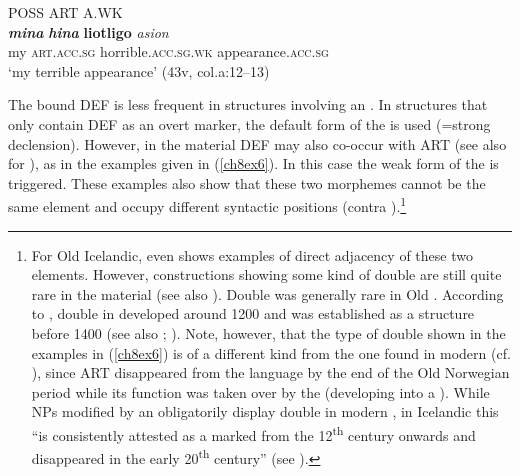 \documentclass[output=paper,colorlinks,citecolor=brown]{langscibook}
\begin{document}
\begin{exe}
\ex\label{ch8ex5}  POSS ART A.WK\\
\gll \textit{\textbf{mina}} \textit{\textbf{hina}} \textbf{liotligo} \textit{asion} \\
my \textsc{art.acc.sg} horrible.\textsc{acc.sg.wk} appearance.\textsc{acc.sg}\\
\glt `my terrible appearance' (43v, col.a:12--13)
\end{exe}

The bound  DEF is less frequent in structures involving an
. In structures that only contain DEF as an overt 
marker, the default form of the  is used (=strong declension).
However, in the  material DEF may also co-occur with ART (see
also \citealp[18]{Pfaff2019} for ), as in the examples given in (\ref{ch8ex6}).
In this case the weak form of the  is triggered. These examples
also show that these two morphemes cannot be the same element and occupy
different syntactic positions (contra \citealp{Faarlund04}).\footnote{For Old
  Icelandic, \citet[18]{Pfaff2019} even shows examples of direct adjacency of
  these two elements. However, constructions showing some kind of double
   are still quite rare in the  material (see also
  \citealp{Lundeby1965}). Double  was generally rare in Old 
  \citep[58]{Faarlund04}. According to \citet{Lundeby1965}, double 
  in  developed around 1200 and was established as a
  structure before 1400 (see also \citealp[290]{Lohndal2007}; \citealp{vanGelderenLohndal2008}). Note, however, that the type of double 
  shown in the examples in (\ref{ch8ex6}) is of a different kind from the one found in
  modern  (cf. \citealp[292]{LanderHaegeman2014}), since ART
  disappeared from the language by the end of the Old Norwegian period %
  while its function was taken over
  by the  (developing into a ). 
  While NPs modified by an  obligatorily display double  in modern , in Icelandic this ``is consistently attested
  as a marked  from the 12\textsuperscript{th} century onwards and disappeared in
  the early 20\textsuperscript{th} century'' (see \citealp[19]{Pfaff2019}).}
\end{document}
